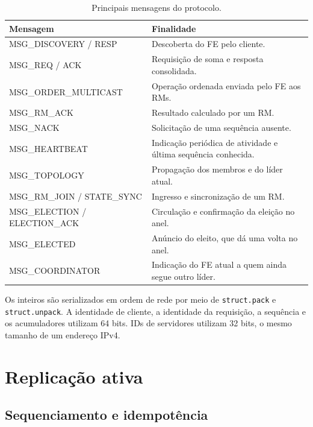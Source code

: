 \documentclass[12pt,a4paper]{article}
\newcommand{\arquivo}[1]{\texttt{#1}}
\begin{document}
\begin{table}[H]
    \centering
    \caption{Principais mensagens do protocolo.}
    \label{tab:mensagens}
    \begin{tabularx}{\textwidth}{>{\ttfamily}l X}
        \toprule
        \normalfont\bfseries Mensagem & \normalfont\bfseries Finalidade \\
        \midrule
        MSG\_DISCOVERY / RESP & Descoberta do FE pelo cliente. \\
        MSG\_REQ / ACK & Requisição de soma e resposta consolidada. \\
        MSG\_ORDER\_MULTICAST & Operação ordenada enviada pelo FE aos RMs. \\
        MSG\_RM\_ACK & Resultado calculado por um RM. \\
        MSG\_NACK & Solicitação de uma sequência ausente. \\
        MSG\_HEARTBEAT & Indicação periódica de atividade e última sequência conhecida. \\
        MSG\_TOPOLOGY & Propagação dos membros e do líder atual. \\
        MSG\_RM\_JOIN / STATE\_SYNC & Ingresso e sincronização de um RM. \\
        MSG\_ELECTION / ELECTION\_ACK & Circulação e confirmação da eleição no anel. \\
        MSG\_ELECTED & Anúncio do eleito, que dá uma volta no anel. \\
        MSG\_COORDINATOR & Indicação do FE atual a quem ainda segue outro líder. \\
        \bottomrule
    \end{tabularx}
\end{table}

Os inteiros são serializados em ordem de rede por meio de
\arquivo{struct.pack} e \arquivo{struct.unpack}. A identidade de cliente, a
identidade da requisição, a sequência e os acumuladores utilizam 64 bits. IDs de
servidores utilizam 32 bits, o mesmo tamanho de um endereço IPv4.

\section{Replicação ativa}

\subsection{Sequenciamento e idempotência}
\end{document}
